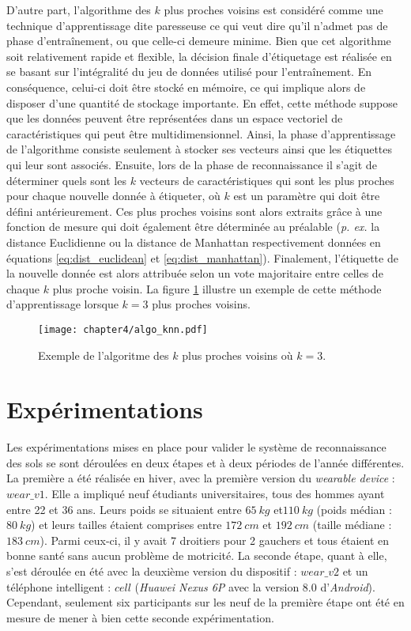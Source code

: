 D'autre part, l'algorithme des $k$ plus proches voisins est considéré comme une technique d'apprentissage dite \og{}paresseuse\fg{} ce qui veut dire qu'il n'admet pas de phase d'entraînement, ou que celle-ci demeure minime. Bien que cet algorithme soit relativement rapide et flexible, la décision finale d'étiquetage est réalisée en se basant sur l'intégralité du jeu de données utilisé pour l'entraînement. En conséquence, celui-ci doit être stocké en mémoire, ce qui implique alors de disposer d'une quantité de stockage importante. En effet, cette méthode suppose que les données peuvent être représentées dans un espace vectoriel de caractéristiques qui peut être multidimensionnel. Ainsi, la phase d'apprentissage de l'algorithme consiste seulement à stocker ses vecteurs ainsi que les étiquettes qui leur sont associés. Ensuite, lors de la phase de reconnaissance il s'agit de déterminer quels sont les $k$ vecteurs de caractéristiques qui sont les plus proches pour chaque nouvelle donnée à étiqueter, où $k$ est un paramètre qui doit être défini antérieurement. Ces plus proches voisins sont alors extraits grâce à une fonction de mesure qui doit également être déterminée au préalable (\textit{p. ex.} la distance Euclidienne ou la distance de Manhattan respectivement données en équations \ref{eq:dist_euclidean} et \ref{eq:dist_manhattan}). Finalement, l'étiquette de la nouvelle donnée est alors attribuée selon un vote majoritaire entre celles de chaque $k$ plus proche voisin. La figure \ref{fig:algo_knn} illustre un exemple de cette méthode d'apprentissage lorsque $k=3$ plus proches voisins.

\begin{figure}[H]
	\centering
	\texttt{[image: chapter4/algo\_knn.pdf]}
        \caption{Exemple de l'algoritme des $k$ plus proches voisins où $k=3$.}
	\label{fig:algo_knn}
\end{figure}

\section{Expérimentations}
\label{sec:expe}

Les expérimentations mises en place pour valider le système de reconnaissance des sols se sont déroulées en deux étapes et à deux périodes de l'année différentes. La première a été réalisée en hiver, avec la première version du \textit{wearable device} : $wear\_v1$. Elle a impliqué neuf étudiants universitaires, tous des hommes ayant entre 22 et 36 ans. Leurs poids se situaient entre $65\: kg$ et$ 110\: kg$ (poids médian : $80\: kg$) et leurs tailles étaient comprises entre $172\: cm$ et $192\: cm$ (taille médiane : $183\: cm$). Parmi ceux-ci, il y avait 7 droitiers pour 2 gauchers et tous étaient en bonne santé sans aucun problème de motricité. La seconde étape, quant à elle, s'est déroulée en été avec la deuxième version du dispositif : $wear\_v2$ et un téléphone intelligent : $cell$ (\textit{Huawei Nexus 6P} avec la version $8.0$ d'\textit{Android}). Cependant, seulement six participants sur les neuf de la première étape ont été en mesure de mener à bien cette seconde expérimentation.

